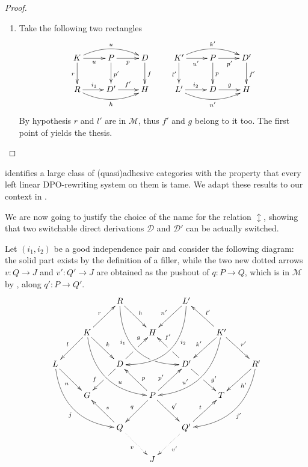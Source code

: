 \documentclass[a4paper,UKenglish,cleveref,pdftex, thm-restate,numberwithinsect]{lipics}
\newcommand{\dder}[1]{\mathscr{#1}}
\begin{document}
\begin{proof}
\begin{enumerate}
	\item Take the following two rectangles
\[\xymatrix{K \ar@/^.4cm/[rr]^{u}\ar[d]_{r}\ar[r]_{u} &P\ar[d]^{p'} \ar[r]_{p} & D \ar[d]^{f}&K' \ar@/^.4cm/[rr]^{k'}\ar[d]_{l'}\ar[r]_{u'} &P\ar[d]^{p} \ar[r]_{p'} & D' \ar[d]^{f'}\\  R \ar@/_.4cm/[rr]_{h} \ar[r]^{i_1}&D' \ar[r]^{f'} & H&L' \ar@/_.4cm/[rr]_{n'} \ar[r]^{i_2}&D \ar[r]^{g} & H}\]
	By hypothesis $r$ and $l'$ are in $\mathcal{M}$, thus $f'$ and $g$ belong to it too. The first point of   yields the thesis. \qedhere 
\end{enumerate}
\end{proof}

\begin{remark} \cite{baldan2011adhesivity} identifies a large class of (quasi)adhesive categories with the property that every left linear DPO-rewriting system on them is tame. We adapt these results to our context in . 
\end{remark}
\begin{definition}
\end{definition}

\begin{remark}
\end{remark}


We are now going to justify the choice of the name for the relation $\updownarrow$, showing that two switchable direct derivations $\dder{D}$ and $\dder{D'}$ can be actually switched. 

Let $(i_1, i_2)$ be a good independence pair and consider the following diagram: the solid part exists by the definition of a filler, while the two new dotted arrows $v\colon Q\to J$ and $v'\colon Q'\to J$ are obtained  as the pushout of $q\colon P\to Q$, which is in $\mathcal{M}$ by , along $q'\colon P\to Q'$.
	\[\xymatrix{&&R \ar@/_1cm/[ddrr]_(.35){i_1}|(.7)\hole \ar[dr]^{h}&& L'\ar@/^1cm/[ddll]^(.35){i_2}  \ar[dl]_{n'}\\&K\ar[dr]^{k}\ar[dl]_{l} \ar@/_.8cm/[ddrr]^(.65){u}\ar[ur]^{r}&& H && K' \ar@/^.8cm/[ddll]_(.65){u'}\ar[dl]_{k'}\ar[lu]_{l'} \ar[dr]^{r'}\\L \ar[dr]_{n} \ar@/_.8cm/[ddrr]_{j}&& D \ar[dl]|(.42)\hole_(.64){f}\ar[ur]|(.48)\hole^(.7){g}&&D' \ar[dr]|(.42)\hole^(.65){g'} \ar[ul]|(.48)\hole_(.7){f'}&&R'\ar@/^.8cm/[ddll]^{j'}\ar[dl]^{h'}\\&G &&P\ar[dr]^{q'} \ar[dl]_{q}\ar[ur]^(.4){p'}\ar[ul]_(.4){p}&&T\\&&Q \ar[ul]_{s}\ar@{.>}[dr]_{v} &&Q'\ar[ur]^{t} \ar@{.>}[dl]^{v'}\\&&&J}\]
	
\end{document}
